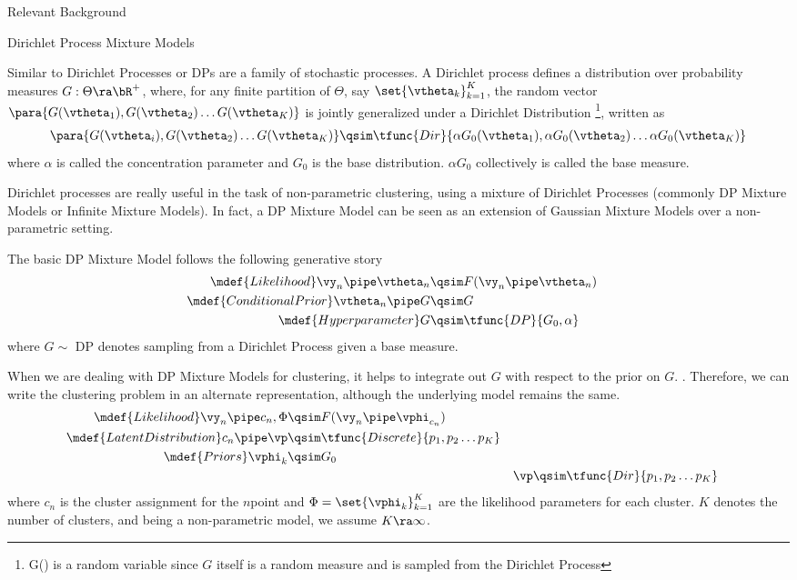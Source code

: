 \documentclass{article}
\begin{document}
\begin{psection}{Relevant Background}
	\begin{psubsection}{Dirichlet Process Mixture Models}

		Similar to Dirichlet Processes or DPs are a family of stochastic processes.
		A Dirichlet process defines a distribution over probability measures $G : \Theta \ra \bR^+$, where, for any finite partition of $\Theta$, say $\set{\vtheta_k}_{k = 1}^K$, the random vector $\para{G(\vtheta_1), G(\vtheta_2) \dots G(\vtheta_K)}$ is jointly generalized under a Dirichlet Distribution \citep{murphy} \footnote{G(\vtheta) is a random variable since $G$ itself is a random measure and is sampled from the Dirichlet Process}, written as
		\begin{align*}
			\para{G(\vtheta_i), G(\vtheta_2) \dots G(\vtheta_K)}	\qsim	\tfunc{Dir}{\alpha G_0(\vtheta_1), \alpha G_0(\vtheta_2) \dots \alpha G_0(\vtheta_K)}
		\end{align*}
		where $\alpha$ is called the concentration parameter and $G_0$ is the base distribution. $\alpha G_0$ collectively is called the base measure.

		Dirichlet processes are really useful in the task of non-parametric clustering, using a mixture of Dirichlet Processes \citep{dp-ferg, dp-anto} (commonly DP Mixture Models or Infinite Mixture Models).
		In fact, a DP Mixture Model can be seen as an extension of Gaussian Mixture Models over a non-parametric setting.

		The basic DP Mixture Model follows the following generative story
		\begin{align*}
			\mdef{Likelihood}			\vy_n \pipe \vtheta_n	&\qsim	F(\vy_n \pipe \vtheta_n) &\\
			\mdef{Conditional Prior}	\vtheta_n \pipe G			&\qsim	G \\
			\mdef{Hyperparameter}				G						&\qsim	\tfunc{DP}{G_0, \alpha}
		\end{align*}
		where $G \sim$ DP denotes sampling from a Dirichlet Process given a base measure.

		When we are dealing with DP Mixture Models for clustering, it helps to integrate out $G$ with respect to the prior on $G$. \citep{neal}. Therefore, we can write the clustering problem in an alternate representation, although the underlying model remains the same.
		\begin{align*}
			\mdef{Likelihood}			\vy_n \pipe c_n, \Phi	&\qsim	F(\vy_n \pipe \vphi_{c_n}) & \\
			\mdef{Latent Distribution}	c_n \pipe \vp			&\qsim	\tfunc{Discrete}{p_1, p_2 \dots p_K} \\
			\mdef{Priors}				\vphi_k					&\qsim	G_0 & \\
			&&							\vp						&\qsim	\tfunc{Dir}{p_1, p_2 \dots p_K}
		\end{align*}
		where $c_n$ is the cluster assignment for the $n$\tth point and $\Phi = \set{\vphi_k}_{k = 1}^{K}$ are the likelihood parameters for each cluster. $K$ denotes the number of clusters, and being a non-parametric model, we assume $K \ra \infty$.


\end{psubsection}
\end{psection}
\end{document}
